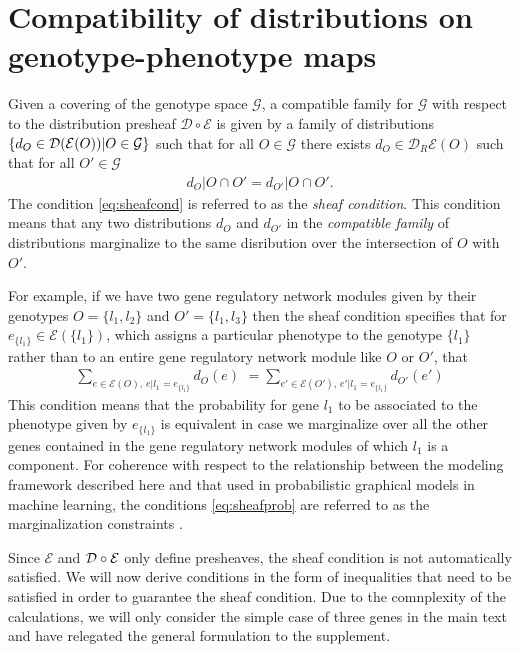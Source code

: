 \section{Compatibility of distributions on genotype-phenotype maps}\label{sec:compatibilityofgpms}
Given a covering of the genotype space $\mathcal{G}$, a compatible family for $\mathcal{G}$ with respect to the distribution presheaf $\mathcal{D} \circ \mathcal{E}$ is given by a family of distributions $\{d_O \in \mathcal{D} (\mathcal{E}(O)) | O \in \mathcal{G}\}$ such that for all $O \in \mathcal{G}$ there exists $d_O \in \mathcal{D}_R\mathcal{E}(O)$ such that for all $O' \in \mathcal{G}$
\begin{eqnarray}\label{eq:sheafcond}
d_O|O \cap O' = d_{O'}|O \cap O'.
\end{eqnarray}
The condition \ref{eq:sheafcond} is referred to as the \emph{sheaf condition}. This condition means that any two distributions $d_O$ and $d_{O'}$ in the \emph{compatible family} of distributions marginalize to the same disribution over the intersection of $O$ with $O'$.

For example, if we have two gene regulatory network modules given by their genotypes $O = \{l_1, l_2\}$ and $O' = \{l_1, l_3\}$ then the sheaf condition specifies that for $e_{\{l_1\}} \in \mathcal{E}(\{l_1\})$, which assigns a particular phenotype to the genotype $\{l_1\}$ rather than to an entire gene regulatory network module like $O$ or $O'$, that
\begin{eqnarray}\label{eq:sheafprob}
\sum_{e \in \mathcal{E}(O),\, e|l_1=e_{\{l_1\}}} d_O(e) \,\, = \sum_{e' \in \mathcal{E}(O'),\, e'|l_1=e_{\{l_1\}}} d_{O'}(e')
\end{eqnarray}
This condition means that the probability for gene $l_1$ to be associated to the phenotype given by $e_{\{l_1\}}$ is equivalent in case we marginalize over all the other genes contained in the gene regulatory network modules of which $l_1$ is a component. For coherence with respect to the relationship between the modeling framework described here and that used in probabilistic graphical models in machine learning, the conditions \ref{eq:sheafprob} are referred to as the marginalization constraints \cite{Wainwright2007}.

Since $\mathcal{E}$ and $\mathcal{D} \circ \mathcal{E}$ only define presheaves, the sheaf condition is not automatically satisfied.  We will now derive conditions in the form of inequalities that need to be satisfied in order to guarantee the sheaf condition.  Due to the comnplexity of the calculations, we will only consider the simple case of three genes in the main text and have relegated the general formulation to the supplement.

